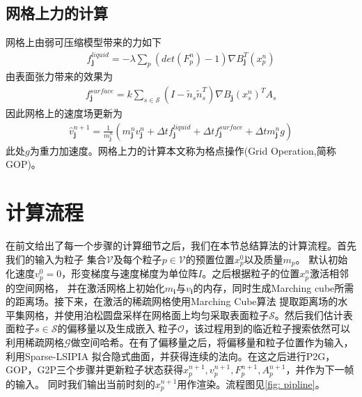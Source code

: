\subsection{网格上力的计算}
网格上由弱可压缩模型带来的力如下
\begin{align}
    f^{liquid}_{\mathbf{j}} = -\lambda \sum_p (det(F_p^n) - 1)\nabla B_{\mathbf{j}}^T(x_p^n)
\end{align}
由表面张力带来的效果为
\begin{align}
    f^{surface}_{\mathbf{j}} = k \sum_{s\in\mathcal{S}}(I - \tilde{n}_s\tilde{n}_s^T)\nabla B_{\mathbf{j}}(x_s^n)^TA_s
\end{align}
因此网格上的速度场更新为
\begin{align}
    \hat{v}_{\mathbf{j}}^{n+1} = \frac{1}{m_\mathbf{j}^n}(m_{\mathbf{j}}^nv_{\mathbf{j}}^n + \Delta t f^{liquid}_{\mathbf{j}} + \Delta t f^{surface}_{\mathbf{j}} +\Delta t m_\mathbf{j}^n g)
\end{align}
此处$g$为重力加速度。网格上力的计算本文称为格点操作(Grid Operation,简称GOP)。
\section{计算流程}
在前文给出了每一个步骤的计算细节之后，我们在本节总结算法的计算流程。首先我们的输入为粒子
集合$\mathcal{V}$及每个粒子$p\in\mathcal{V}$的预置位置$x_p^0$以及质量$m_p$。
默认初始化速度$v_p^0 = 0$，形变梯度与速度梯度为单位阵$I$。之后根据粒子的位置$x_p^n$激活相邻的空间网格，
并在激活网格上初始化$m_\mathbf{i}$与$v_\mathbf{i}$的内存，同时生成Marching cube所需的距离场。接下来，在激活的稀疏网格使用Marching Cube算法
提取距离场的水平集网格，并使用泊松圆盘采样在网格面上均匀采取表面粒子$\mathcal{S}$。然后我们估计表面粒子$s\in \mathcal{S}$的偏移量以及生成嵌入
粒子$\mathcal{O}$，该过程用到的临近粒子搜索依然可以利用稀疏网格$\mathcal{G}$做空间哈希。在有了偏移量之后，将偏移量和粒子位置作为输入，利用Sparse-LSIPIA
拟合隐式曲面，并获得连续的法向。在这之后进行P2G，GOP，G2P三个步骤并更新粒子状态获得$x_p^{n+1},v_p^{n+1},F_p^{n+1},A_p^{n+1}$，并作为下一帧的输入。
同时我们输出当前时刻的$x_p^{n+1}$用作渲染。流程图见\ref{fig: pipline}。

